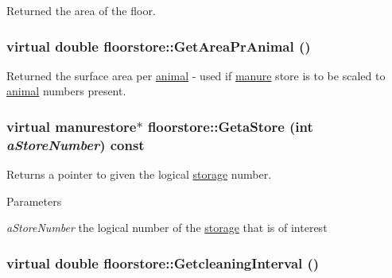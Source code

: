 Returned the area of the floor. \hypertarget{classfloorstore_a6bcde59d5cf3b9c00f87eefbd675faa2}{
\subsubsection[{GetAreaPrAnimal}]{\setlength{\rightskip}{0pt plus 5cm}virtual double floorstore::GetAreaPrAnimal ()}}
\label{classfloorstore_a6bcde59d5cf3b9c00f87eefbd675faa2}


Returned the surface area per \hyperlink{classanimal}{animal} -\/ used if \hyperlink{classmanure}{manure} store is to be scaled to \hyperlink{classanimal}{animal} numbers present. \hypertarget{classfloorstore_af05d6f52ff047513b85b5cd660b8e8fc}{
\subsubsection[{GetaStore}]{\setlength{\rightskip}{0pt plus 5cm}virtual {\bf manurestore}$\ast$ floorstore::GetaStore (int {\em aStoreNumber}) const}}
\label{classfloorstore_af05d6f52ff047513b85b5cd660b8e8fc}


Returns a pointer to given the logical \hyperlink{classstorage}{storage} number. 
\begin{DoxyParams}{Parameters}
\item[{\em aStoreNumber}]the logical number of the \hyperlink{classstorage}{storage} that is of interest \end{DoxyParams}
\hypertarget{classfloorstore_ad6d22909cdeef814833b7e37d136fca6}{
\subsubsection[{GetcleaningInterval}]{\setlength{\rightskip}{0pt plus 5cm}virtual double floorstore::GetcleaningInterval ()}}
\label{classfloorstore_ad6d22909cdeef814833b7e37d136fca6}



